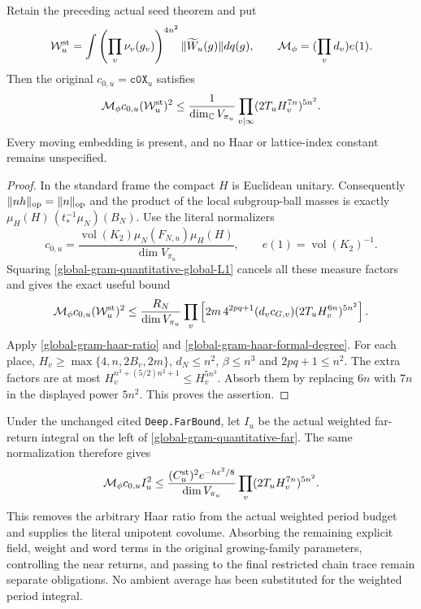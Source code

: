 \begin{theorem}
\label{global-gram-haar-normalized-budget}
Retain the preceding actual seed theorem and put
\[
 {\cal W}_u^{\rm st}
  =\int\left(\prod_v\nu_v(g_v)\right)^{4n^2}
                      \|\widetilde W_u(g)\|dq(g),\qquad
 \mathcal M_\phi=(\prod_vd_v)e(1).
\]
Then the original $c_{0,u}=\texttt{c0X}_u$ satisfies
\begin{equation}\label{global-gram-haar-normalized-result}
 \mathcal M_\phi c_{0,u}({\cal W}_u^{\rm st})^2
 \le\frac1{\dim_{\mathbb C}V_{\pi_u}}
                  \prod_{v\mid\infty}(2T_u H_v^{7n})^{5n^2}.
\end{equation}
Every moving embedding is present, and no Haar or lattice-index
constant remains unspecified.
\end{theorem}
\begin{proof}
In the standard frame the compact $H$ is Euclidean unitary.
Consequently $\|nh\|_{\rm op}=\|n\|_{\rm op}$ and the
product of the local subgroup-ball masses is exactly
$\mu_H(H)\,(t^{-1}_*\mu_N)(B_N)$.
Use the literal normalizers
\[
 c_{0,u}=\frac{\operatorname{vol}(K_2)\mu_N(F_{N,u})\mu_H(H)}
                    {\dim V_{\pi_u}},\qquad
 e(1)=\operatorname{vol}(K_2)^{-1}.
\]
Squaring \eqref{global-gram-quantitative-global-L1} cancels
all these measure factors and gives the exact useful bound
\[
 \mathcal M_\phi c_{0,u}({\cal W}_u^{\rm st})^2
 \le\frac{R_N}{\dim V_{\pi_u}}\prod_v
   \left[2m\,4^{2pq+1}(d_vc_{G,v})
                          (2T_u H_v^{6n})^{5n^2}\right].
\]
Apply \eqref{global-gram-haar-ratio} and
\eqref{global-gram-haar-formal-degree}.
For each place, $H_v\ge\max\{4,n,2B_v,2m\}$,
$d_N\le n^2$, $\beta\le n^3$ and $2pq+1\le n^2$.
The extra factors are at most
$H_v^{n^3+(5/2)n^2+1}\le H_v^{5n^3}$.
Absorb them by replacing $6n$ with $7n$ in the displayed
power $5n^2$.  This proves the assertion.
\end{proof}

Under the unchanged cited \texttt{Deep.FarBound}, let $I_u$ be
the actual weighted far-return integral on the left of
\eqref{global-gram-quantitative-far}.  The same normalization
therefore gives
\[
 \mathcal M_\phi c_{0,u} I_u^2
 \le\frac{(C_u^{\rm st})^2e^{-h\varepsilon^2/8}}
                {\dim V_{\pi_u}}
              \prod_v(2T_u H_v^{7n})^{5n^2}.
\]
This removes the arbitrary Haar ratio from the actual weighted
period budget and supplies the literal unipotent covolume.
Absorbing the remaining explicit field, weight and word terms
in the original growing-family parameters, controlling the
near returns, and passing to the final restricted chain trace
remain separate obligations.  No ambient average has been
substituted for the weighted period integral.

